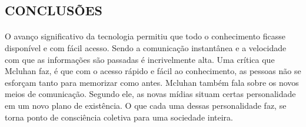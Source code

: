 \documentclass[12pt,a4paper]{article}
\begin{document}
\subsection{CONCLUSÕES}
\paragraph{}
O avanço significativo da tecnologia permitiu que todo o conhecimento ficasse disponível e com fácil acesso.
Sendo a comunicação instantânea e a velocidade com que as informações são passadas é incrivelmente alta.
Uma crítica que Mcluhan\cite{wiki:marshall_mcluhan} faz, é que com o acesso rápido e fácil ao conhecimento, as pessoas não se esforçam tanto para memorizar como antes. \cite{ted:ted_talk_feats_of_memory_anyone_can_do}
Mcluhan também fala sobre os novos meios de comunicação.
Segundo ele, as novas mídias situam certas personalidade em um novo plano de existência.
O que cada uma dessas personalidade faz, se torna ponto de consciência coletiva para uma sociedade inteira.


 


 
\end{document}
